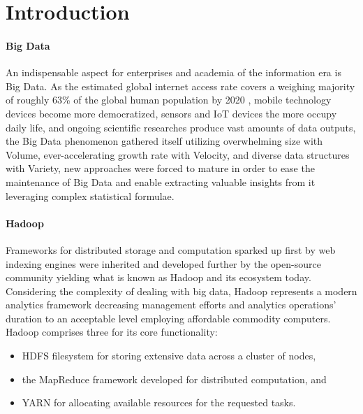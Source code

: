 \documentclass[review]{elsarticle}
\begin{document}
\linenumbers

\section{Introduction}

\paragraph{Big Data}
An indispensable aspect for enterprises and academia of the information era is Big Data. As the estimated global internet access rate covers a weighing majority of roughly 63\% of the global human population by 2020 \cite{noauthor_world_nodate}, mobile technology devices become more democratized, sensors and IoT devices the more occupy daily life, and ongoing scientific researches produce vast amounts of data outputs, the Big Data phenomenon gathered itself utilizing overwhelming size with Volume, ever-accelerating growth rate with Velocity, and diverse data structures with Variety, new approaches were forced to mature in order to ease the maintenance of Big Data and enable extracting valuable insights from it leveraging complex statistical formulae.

\paragraph{Hadoop \cite{noauthor_apache_nodate}}Frameworks for distributed storage and computation sparked up first by web indexing engines were inherited and developed further by the open-source community yielding what is known as Hadoop and its ecosystem today. Considering the complexity of dealing with big data, Hadoop represents a modern analytics framework decreasing management efforts and analytics operations' duration to an acceptable level employing affordable commodity computers. Hadoop comprises three for its core functionality:

\begin{itemize}
	\item HDFS filesystem for storing extensive data across a cluster of nodes,
	\item the MapReduce framework developed for distributed computation, and 
	\item YARN for allocating available resources for the requested tasks.
\end{itemize}
\end{document}
